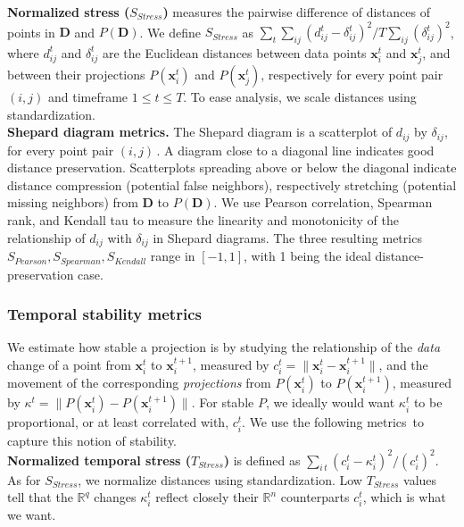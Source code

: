 \noindent\textbf{Normalized stress ($S_{Stress}$)} measures the pairwise difference of distances of points in $\mathbf{D}$ and $P(\mathbf{D})$. We define $S_{Stress}$ as $\sum_t \sum_{ij}(d_{ij}^t - {\delta_{ij}^t})^{2} / T\sum_{ij} (\delta_{ij}^t)^{2}$, where $d_{ij}^t$ and ${\delta_{ij}^t}$ are the Euclidean distances between data points $\mathbf{x}_i^t$ and $\mathbf{x}_j^t$, and between their projections $P(\mathbf{x}_i^t)$ and $P(\mathbf{x}_j^t)$, respectively for every point pair $(i,j)$ and timeframe $1 \leq t \leq T$. To ease analysis, we scale distances using standardization.\\

\noindent\textbf{Shepard diagram metrics.} The Shepard diagram is a scatterplot of $d_{ij}$ by $\delta_{ij}$, for every point pair $(i,j)$\,\citep{Joia2011}. A diagram close to a diagonal line indicates good distance preservation.
Scatterplots spreading above or below the diagonal indicate distance compression (potential false neighbors), respectively stretching (potential missing neighbors) from $\mathbf{D}$ to $P(\mathbf{D})$. We use Pearson correlation, Spearman rank, and Kendall tau to measure the linearity and monotonicity of the relationship of $d_{ij}$ with $\delta_{ij}$ in Shepard diagrams. The three resulting metrics $S_{Pearson}, S_{Spearman}, S_{Kendall}$ range in $[-1,1]$, with 1 being the ideal distance-preservation case.


\subsubsection{Temporal stability metrics}
%
We estimate how stable a projection is by studying the relationship of the \emph{data} change of a point from $\mathbf{x}_i^t$ to $\mathbf{x}_i^{t+1}$, measured by $ c_i^t = \|\mathbf{x}_i^t - \mathbf{x}_i^{t+1}\|$, 
and the movement of the corresponding \emph{projections} from $P(\mathbf{x}_i^t)$ to $P(\mathbf{x}_i^{t+1})$, measured by $ \kappa^t = \|P(\mathbf{x}_i^t) - P(\mathbf{x}_i^{t+1})\|$. 
For stable $P$, we ideally would want $\kappa_i^t$ to be proportional, or at least correlated with, $c_i^t$. We use the following metrics\,\citep{Vernier2020} to capture this notion of stability.\\

\noindent\textbf{Normalized temporal stress ($T_{Stress}$)} is defined as $\sum_{i\, t}{(c_{i}^{t}-\kappa_{i}^{t})^{2}} / { (c_{i}^t)^{2}}$. As for $S_{Stress}$, we normalize distances using standardization. Low $T_{Stress}$ values tell that the $\mathbb{R}^q$ changes $\kappa_i^t$ reflect closely their $\mathbb{R}^n$ counterparts ${c_i^t}$, which is what we want.\\

